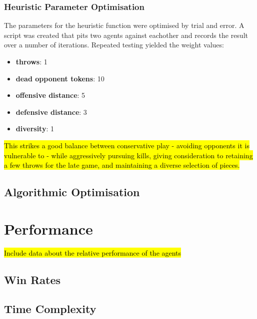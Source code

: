 \documentclass{article}
\begin{document}
\subsubsection{Heuristic Parameter Optimisation}
\label{sec: Heuristic Optimisation}
The parameters for the heuristic function were optimised by trial and error. A script was created that pits two agents against eachother and records the result over a number of iterations. Repeated testing yielded the weight values:
\begin{itemize}
    \item \textbf{throws}: 1
    \item \textbf{dead opponent tokens}: 10
    \item \textbf{offensive distance}: 5
    \item \textbf{defensive distance}: 3
    \item \textbf{diversity}: 1
\end{itemize}
\hl{This strikes a good balance between conservative play - avoiding opponents it is vulnerable to - while aggressively pursuing kills, giving consideration to retaining a few throws for the late game, and maintaining a diverse selection of pieces.}

\subsection{Algorithmic Optimisation}

\section{Performance}
\hl{Include data about the relative performance of the agents}
\subsection{Win Rates}
\subsection{Time Complexity}

\newpage
\printbibliography
\end{document}
